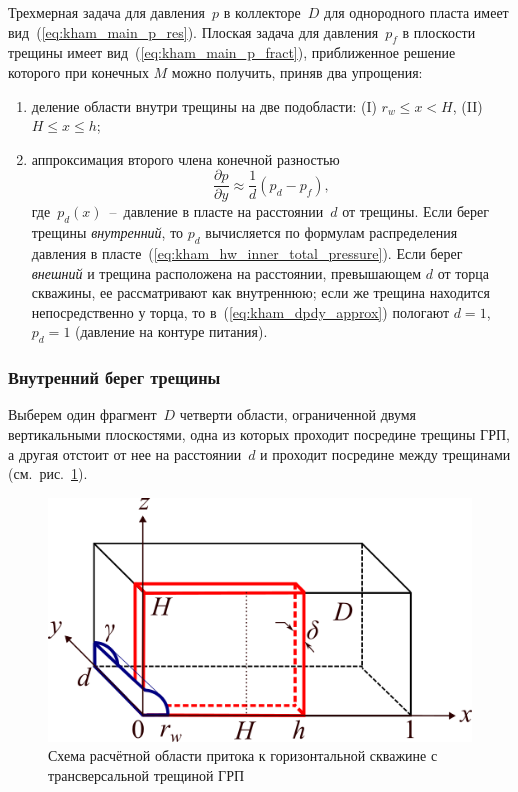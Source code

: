 \documentclass{article}
\begin{document}
Трехмерная задача для давления~$p$ в коллекторе~$D$ для однородного пласта имеет вид~(\ref{eq:kham_main_p_res}).
Плоская задача для давления~$p_f$ в плоскости трещины имеет вид~(\ref{eq:kham_main_p_fract}), 
 приближенное решение которого при конечных $M$ можно получить, приняв два упрощения:
\begin{enumerate}
	\item деление области внутри трещины на две подобласти: (I) $r_w \leq x < H$, (II) $H \leq x \leq h$;
	\item  аппроксимация второго члена конечной разностью
	      \begin{equation}
		      \displaystyle
		      \dfrac{\partial p}{\partial y} \approx \dfrac{1}{d}\left(p_d - p_f\right),
		      \label{eq:kham_dpdy_approx}
	      \end{equation}
	      где~$p_d(x)$~--~давление в пласте на расстоянии~$d$ от трещины.
	      Если берег трещины \emph{внутренний}, то $p_d$ вычисляется по формулам
	      распределения давления в  пласте~(\ref{eq:kham_hw_inner_total_pressure}). Если берег \emph{внешний} и трещина 
		  расположена на расстоянии, превышающем $d$ от торца скважины, ее рассматривают как внутреннюю; 
	      если же трещина находится непосредственно у торца, то в~(\ref{eq:kham_dpdy_approx})
	      пологают $d = 1$, $p_d = 1$ (давление на контуре питания).
\end{enumerate}

\subsubsection{Внутренний берег трещины}
Выберем один фрагмент~$D$ четверти области, ограниченной двумя вертикальными плоскостями, одна из которых 
проходит посредине трещины ГРП, а другая отстоит от нее на расстоянии~$d$ и проходит посредине между 
трещинами (см.~рис.~\ref{fig:kham_fract_inner_scheme}).

\begin{figure}[H]
	\centering
	\includegraphics[width=0.7\linewidth]{images/schemes/kham_fract_inner_scheme.png}
	\caption{Схема расчётной области притока к горизонтальной скважине с трансверсальной трещиной ГРП}
	\label{fig:kham_fract_inner_scheme}
\end{figure}
\end{document}
